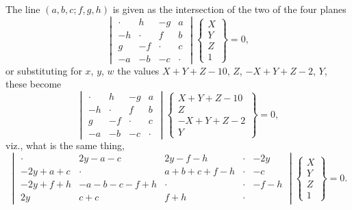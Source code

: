 \documentclass[11pt,a4paper]{article}
\begin{document}
The line $(a, b, c; f, g, h)$ is given as the intersection of the two of
the four planes
\[
\begin{vmatrix}
\cdot & h & -g & a \\
-h & \cdot & f & b \\
g & -f & \cdot & c \\
-a & -b & -c & \cdot
\end{vmatrix} \begin{Bmatrix} X \\ Y \\ Z \\ 1 \end{Bmatrix} = 0,
\]
or substituting for $x$, $y$, $w$ the values $X + Y + Z - 10$, $Z$,
$-X + Y + Z - 2$, $Y$, these become
\[
\begin{vmatrix}
\cdot & h & -g & a \\
-h & \cdot & f & b \\
g & -f & \cdot & c \\
-a & -b & -c & \cdot
\end{vmatrix} \begin{Bmatrix} X + Y + Z - 10 \\ Z \\ -X + Y + Z - 2 \\ Y \end{Bmatrix} = 0,
\]
viz., what is the same thing,
\[
\begin{vmatrix}
\cdot & 2y - a - c & 2y - f - h & \cdot & -2y \\
-2y + a + c & \cdot & a + b + c + f - h & \cdot & -c \\
-2y + f + h & -a - b - c - f + h & \cdot & \cdot & -f - h \\
2y & c + c & f + h & \cdot
\end{vmatrix}\!\begin{Bmatrix} X \\ Y \\ Z \\ 1 \end{Bmatrix} = 0.
\]
\end{document}
